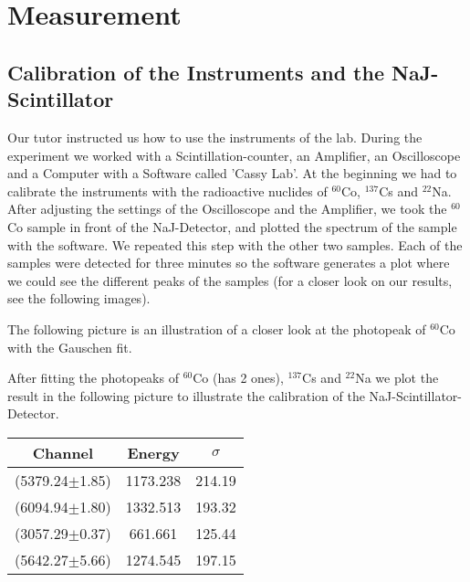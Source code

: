 \section{Measurement}

\subsection{Calibration of the Instruments and the NaJ-Scintillator}
Our tutor instructed us how to use the instruments of the lab. During the experiment we worked with a Scintillation-counter, an Amplifier, an Oscilloscope and a Computer with a Software called 'Cassy Lab'. At the beginning we had to calibrate the instruments with the radioactive nuclides of $^{60}$Co, $^{137}$Cs and $^{22}$Na. After adjusting the settings of the Oscilloscope and the Amplifier, we took the $^{60}$Co sample in front of the NaJ-Detector, and plotted the spectrum of the sample with the software. We repeated this step with the other two samples. Each of the samples were detected for three minutes so the software generates a plot where we could see the different peaks of the samples (for a closer look on our results, see the following images).


The following picture is an illustration of a closer look at the photopeak of $^{60}$Co with the Gauschen fit.


After fitting the photopeaks of $^{60}$Co (has 2 ones), $^{137}$Cs and $^{22}$Na we plot the result in the following picture to illustrate the calibration of the NaJ-Scintillator-Detector.

\begin{center}
\begin{tabular}{c|c|c}
Channel & Energy & $\sigma$\\
\hline
(5379.24$\pm$1.85)& 1173.238 & 214.19\\
(6094.94$\pm$1.80) & 1332.513 &  193.32\\	
(3057.29$\pm$0.37) & 661.661 & 125.44\\
(5642.27$\pm$5.66) & 1274.545 & 197.15\\
\end{tabular}
\end{center}

